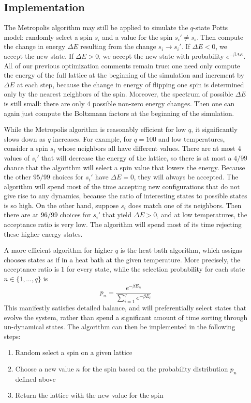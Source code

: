 \documentclass[twocolumn,aps]{revtex4-1} %
\begin{document}
\subsection{Implementation}
The Metropolis algorithm may still be applied to simulate the $q$-state Potts model: randomly select a spin $s_i$ and a value for the spin $s_i' \neq s_i$. Then compute the change in energy $\Delta E$ resulting from the change $s_i \to s_i'$. If $\Delta E < 0$, we accept the new state. If $\Delta E > 0$, we accept the new state with probability $e^{-\beta \Delta E}$. All of our previous optimization comments remain true: one need only compute the energy of the full lattice at the beginning of the simulation and increment by $\Delta E$ at each step, because the change in energy of flipping one spin is determined only by the nearest neighbors of the spin. Moreover, the spectrum of possible $\Delta E$ is still small: there are only 4 possible non-zero energy changes. Then one can again just compute the Boltzmann factors at the beginning of the simulation.

While the Metropolis algorithm is reasonably efficient for low $q$, it significantly slows down as $q$ increases. For example, for $q = 100$ and low temperatures, consider a spin $s_i$ whose neighbors all have different values. There are at most 4 values of $s_i'$ that will decrease the energy of the lattice, so there is at most a $4/99$ chance that the algorithm will select a spin value that lowers the energy. Because the other $95/99$ choices for $s_i'$ have $\Delta E = 0$, they will always be accepted. The algorithm will spend most of the time accepting new configurations that do not give rise to any dynamics, because the ratio of interesting states to possible states is so high. On the other hand, suppose $s_i$ does match one of its neighbors. Then there are at $96/99$ choices for $s_i'$ that yield $\Delta E > 0$, and at low temperatures, the acceptance ratio is very low. The algorithm will spend most of its time rejecting these higher energy states. 

A more efficient algorithm for higher $q$ is the heat-bath algorithm, which assigns chooses states as if in a heat bath at the given temperature. More precisely, the acceptance ratio is 1 for every state, while the selection probability for each state $n \in \{1,\ldots,q\}$ is
\begin{equation}
	p_n = \frac{e^{-\beta E_n}}{\sum_{i=1}^q e^{-\beta E_i}}
\end{equation}
This manifestly satisfies detailed balance, and will preferentially select states that evolve the system, rather than spend a significant amount of time sorting through un-dynamical states. The algorithm can then be implemented in the following steps:
\begin{enumerate}
	\item Random select a spin on a given lattice
	\item Choose a new value $n$ for the spin based on the probability distribution $p_n$ defined above
	\item Return the lattice with the new value for the spin
\end{enumerate}
\end{document}
